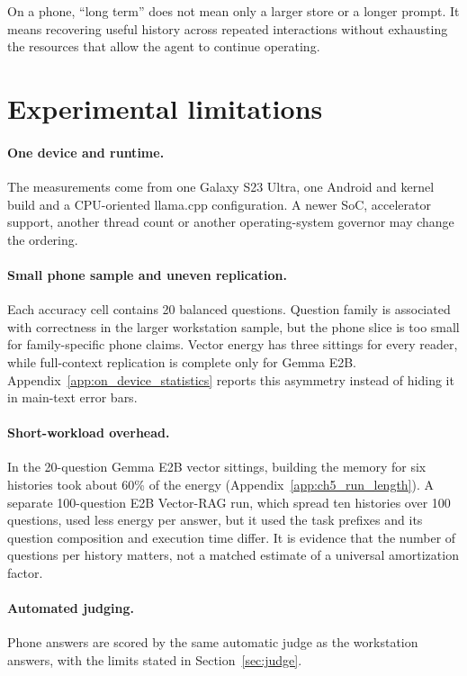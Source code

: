 On a phone, ``long term'' does not mean only a larger store or a longer prompt. It means
recovering useful history across repeated interactions without exhausting the resources
that allow the agent to continue operating.

\section{Experimental limitations}
\label{sec:ch5_threats}

\paragraph{One device and runtime.}
The measurements come from one Galaxy S23 Ultra, one Android and kernel build and a
CPU-oriented llama.cpp configuration. A newer SoC, accelerator support, another thread
count or another operating-system governor may change the ordering.

\paragraph{Small phone sample and uneven replication.}
Each accuracy cell contains 20 balanced questions. Question family is associated with
correctness in the larger workstation sample, but the phone slice is too small for
family-specific phone claims. Vector energy has three sittings for every reader, while
full-context replication is complete only for Gemma E2B. Appendix~\ref{app:on_device_statistics} reports this asymmetry instead of hiding it in main-text
error bars.

\paragraph{Short-workload overhead.}
In the 20-question Gemma E2B vector sittings, building the memory for six histories took about
60\% of the energy (Appendix~\ref{app:ch5_run_length}). A separate 100-question E2B Vector-RAG
run, which spread ten histories over 100 questions, used less energy per answer, but it used the
task prefixes and its question composition and execution time differ. It is evidence that the
number of questions per history matters, not a matched estimate of a universal amortization factor.

\paragraph{Automated judging.}
Phone answers are scored by the same automatic judge as the workstation answers, with the
limits stated in Section~\ref{sec:judge}.

